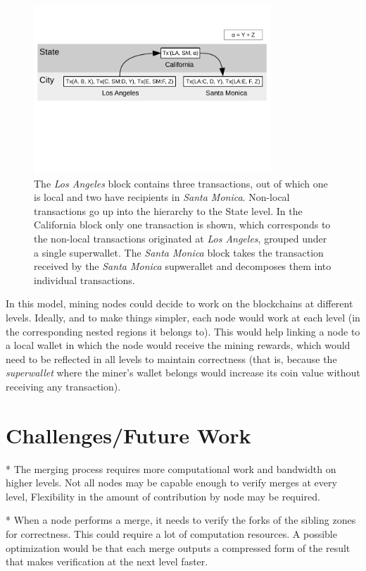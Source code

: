 \begin{figure}
\includegraphics[trim={0 1.8in 0 0.4in},clip,width=3.5in]{superwallet}
\caption{The \textit{Los Angeles} block contains three transactions, out of which
one is local and two have recipients in \textit{Santa Monica}.  Non-local
transactions go up into the hierarchy to the State level.  In the California
block only one transaction is shown, which corresponds to the non-local
transactions originated at \textit{Los Angeles}, grouped under a single
superwallet.  The \textit{Santa Monica} block takes the transaction received by
the \textit{Santa Monica} supwerallet and decomposes them into individual
transactions.}
\label{fig:superwallet}
\end{figure}

In this model, mining nodes could decide to work on the blockchains at
different levels.  Ideally, and to make things simpler, each node would work at
each level (in the corresponding nested regions it belongs to).  This would
help linking a node to a local wallet in which the node would receive the
mining rewards, which would need to be reflected in all levels to maintain
correctness (that is, because the \textit{superwallet} where the miner's wallet
belongs would increase its coin value without receiving any transaction).

\section{Challenges/Future Work}

* The merging process requires more computational work and bandwidth on higher
levels.  Not all nodes may be capable enough to verify merges at every level,
Flexibility in the amount of contribution by node may be required.

* When a node performs a merge, it needs to verify the forks of the sibling
zones for correctness.  This could require a lot of computation resources.  A
possible optimization would be that each merge outputs a compressed form of the
result that makes verification at the next level faster.

